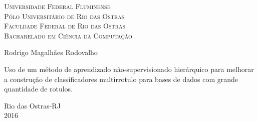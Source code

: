 
\begin{titlepage}
  \begin{center}
\Large{\textsc{Universidade Federal Fluminense} \\
           \textsc{Pólo Universitário de Rio das Ostras} \\ 
           \textsc{Faculdade Federal de Rio das Ostras} \\
           \textsc{Bacharelado em Ciência da Computação}
          }
    \par\vfill
    \LARGE{Rodrigo Magalhães Rodovalho}
    \par\vfill
    \LARGE{Uso de um método de aprendizado não-supervisionado hierárquico para melhorar
a construção de classificadores multirrotulo para bases de dados com grande quantidade de rotulos.}
    \par\vfill
    \Large{Rio das Ostras-RJ\\2016}
  \end{center}
\end{titlepage}
